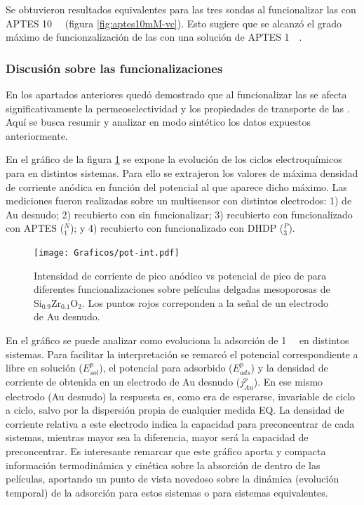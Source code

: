 		  Se obtuvieron resultados equivalentes para las tres sondas al funcionalizar las \pdmZ\space con APTES \SI{10}{\milli\Molar} (figura \ref{fig:aptes10mM-vc}). Esto sugiere que se alcanzó el grado máximo de funcionzalización de las \pdmZ\space con una solución de APTES \SI{1}{\milli\Molar}.

	 	\subsubsection{Discusión sobre las funcionalizaciones}

	 	 En los apartados anteriores quedó demostrado que al funcionalizar las \pdmZ\space se afecta significativamente la permeoselectividad y los propiedades de transporte de las \pdm. Aquí se busca resumir y analizar en modo sintético los datos expuestos anteriormente. 

	 	 En el gráfico de la figura \ref{fig:pot-int} se expone la evolución de los ciclos electroquímicos para \ru\space en distintos sistemas. Para ello se extrajeron los valores de máxima densidad de corriente anódica en función del potencial al que aparece dicho máximo. Las mediciones fueron realizadas sobre un multisensor con distintos electrodos: 1) de Au desnudo; 2) recubierto con \pdmZ\space sin funcionalizar; 3) recubierto con \pdmZ\space funcionalizado con APTES (\pdmZ$^N_1$); y 4) recubierto con \pdmZ\space funcionalizado con DHDP (\pdmZ$^P_3$).

	 			 \begin{figure}[th!]	
					\centering
			 	    \texttt{[image: Graficos/pot-int.pdf]}
			        \caption[Evolución de la señal de \ru\space para distintos sistemas]{Intensidad de corriente de pico anódico vs potencial de pico de \aminorutenio\space para diferentes funcionalizaciones sobre películas delgadas mesoporosas de Si$_{0.9}$Zr$_{0.1}$O$_2$. Los puntos rojos correponden a la señal de un electrodo de Au desnudo.}
			        \label{fig:pot-int}
			        \vspace*{3mm}
			      	\end{figure}

	 	 \pagebreak En el gráfico se puede analizar como evoluciona la adsorción de \ru\space \SI{1}{\milli\Molar} en distintos sistemas. Para facilitar la interpretación se remarcó el potencial correspondiente a \ru\space libre en solución ($E^p_{sol}$), el potencial para \ru\space adsorbido ($E^p_{ads}$) y la densidad de corriente de \ru\space obtenida en un electrodo de Au desnudo ($j^p_{Au}$). En ese mismo electrodo (Au desnudo) la respuesta es, como era de esperarse, invariable de ciclo a ciclo, salvo por la dispersión propia de cualquier medida EQ. La densidad de corriente relativa a este electrodo indica la capacidad para preconcentrar de cada sistemas, mientras mayor sea la diferencia, mayor será la capacidad de preconcentrar. Es interesante remarcar que este gráfico aporta y compacta información termodinámica y cinética sobre la absorción de \ru\space dentro de las películas, aportando un punto de vista novedoso sobre la dinámica (evolución temporal) de la adsorción para estos sistemas o para sistemas equivalentes.

